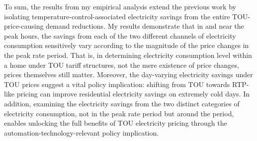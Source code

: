 To sum, the results from my empirical analysis extend the previous work by isolating temperature-control-associated electricity savings from the entire TOU-price-causing demand reductions. My results demonstrate that in and near the peak hours, the savings from each of the two different channels of electricity consumption sensitively vary according to the magnitude of the price changes in the peak rate period. That is, in determining electricity consumption level within a home under TOU tariff structures, not the mere existence of price changes, prices themselves still matter. Moreover, the day-varying electricity savings under TOU prices suggest a vital policy implication: shifting from TOU towards RTP-like pricing can improve residential electricity savings on extremely cold days. In addition, examining the electricity savings from the two distinct categories of electricity consumption, not in the peak rate period but around the period, enables unlocking the full benefits of TOU electricity pricing through the automation-technology-relevant policy implication.